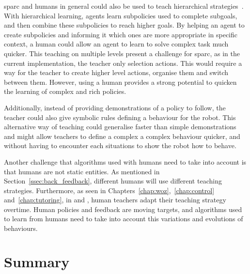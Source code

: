 \gls{sparc} and humans in general could also be used to teach hierarchical strategies~\citep{botvinick2012hierarchical}. With hierarchical learning, agents learn subpolicies used to complete subgoals, and then combine these subpolicies to reach higher goals. By helping an agent to create subpolicies and informing it which ones are more appropriate in specific context, a human could allow an agent to learn to solve complex task much quicker. This teaching on multiple levels present a challenge for \gls{sparc}, as in the current implementation, the teacher only selection actions. This would require a way for the teacher to create higher level actions, organise them and switch between them. However, using a human provides a strong potential to quicken the learning of complex and rich policies.

Additionally, instead of providing demonstrations of a policy to follow, the teacher could also give symbolic rules defining a behaviour for the robot. This alternative way of teaching could generalise faster than simple demonstrations and might allow teachers to define a complex a complex behaviour quicker, and without having to encounter each situations to show the robot how to behave.

Another challenge that algorithms used with humans need to take into account is that humans are not static entities. As mentioned in Section~\ref{ssec:back_feedback}, different humans will use different teaching strategies. Furthermore, as seen in Chapters~\ref{chap:woz},~\ref{chap:control} and~\ref{chap:tutoring}, in \cite{thomaz2008teachable} and \cite{macglashan2017interactive}, human teachers adapt their teaching strategy overtime. Human policies and feedback are moving targets, and algorithms used to learn from humans need to take into account this variations and evolutions of behaviours.

\section{Summary} \label{sec:disc_summary}


